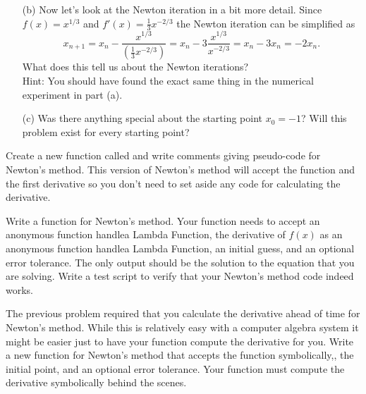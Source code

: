 \begin{problem}
\begin{enumerate}
\item[(b)] Now let's look at the Newton iteration in a bit more detail.  Since $f(x) =
    x^{1/3}$ and $f'(x) = \frac{1}{3} x^{-2/3}$ the Newton iteration can be simplified as 
    \[ x_{n+1} = x_n - \frac{x^{1/3}}{ \left( \frac{1}{3} x^{-2/3} \right)} = x_n - 3 \frac{x^{1/3}}{x^{-2/3}} =
    x_n - 3x_n = -2x_n. \]
    What does this tell us about the Newton iterations?  \\ Hint: You should have found
    the exact same thing in the numerical experiment in part (a).
\item[(c)] Was there anything special about the starting point $x_0=-1$?  Will this
    problem exist for every starting point?
    \end{enumerate}
\end{problem}

\begin{problem}
    Create a new \ProgLang function called  and write comments giving
    pseudo-code for Newton's method.  This version of Newton's method will accept the
    function and the first derivative so you don't need to set aside any code for
    calculating the derivative.
\end{problem}

\begin{problem}
    Write a \ProgLang function for Newton's method.  Your function needs to accept 
    \ifnum{} an anonymous function
    handle\else a Lambda Function\fi, the derivative of $f(x)$ as \ifnum{} an anonymous function
    handle\else a Lambda Function\fi,
    an initial guess, and an optional error tolerance. The only output should be the
    solution to the equation that you are solving.  Write a test script to verify that
    your Newton's method code indeed works.
    \\
    \ifnum{}
    \else
    \fi
\end{problem}

\begin{problem}
    The previous problem required that you calculate the derivative ahead of time for
    Newton's method.  While this is relatively easy with a computer algebra system it
    might be easier just to have your function compute the derivative for you.  Write a
    new \ProgLang function for Newton's method that accepts the function symbolically,, the initial point, and an optional error tolerance.  Your function
    must compute the derivative symbolically behind the scenes. \\
    \ifnum{}
    \else
    \fi
\end{problem}

